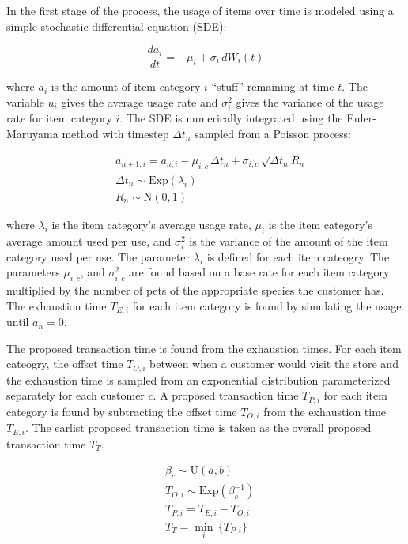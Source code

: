 \documentclass[conference]{IEEEtran}
\begin{document}
In the first stage of the process, the usage of items over time is modeled using a simple stochastic differential equation (SDE):

\begin{equation}
\frac{da_i}{dt} = -\mu_i + \sigma_i\, dW_i(t)
\end{equation}

where $a_i$ is the amount of item category $i$ ``stuff'' remaining at time $t$. The variable $u_i$ gives the average usage rate and $\sigma^2_i$ gives the variance of the usage rate for item category $i$. The SDE is numerically integrated using the Euler-Maruyama method\cite{Klouden13} with timestep $\Delta t_n$ sampled from a Poisson process:

\begin{align}
&a_{n+1, i} = a_{n,i} - \mu_{i, c} \, \Delta t_n + \sigma_{i, c} \, \sqrt{\Delta t_n} R_n \\
&\Delta t_n \sim \text{Exp}(\lambda_i) \nonumber \\
&R_n \sim \text{N}(0, 1) \nonumber
\end{align}

where $\lambda_i$ is the item category's average usage rate, $\mu_i$ is the item category's average amount used per use, and $\sigma^2_i$ is the variance of the amount of the item category used per use. The parameter $\lambda_i$ is defined for each item cateogry.  The parameters $\mu_{i, c}$, and $\sigma^2_{i,c}$ are found based on a base rate for each item category multiplied by the number of pets of the appropriate species the customer has.  The exhaustion time $T_{E,i}$ for each item category is found by simulating the usage until $a_n = 0$.

The proposed transaction time is found from the exhaustion times.  For each item cateogry, the offset time $T_{O, i}$ between when a customer would visit the store and the exhaustion time is sampled from an exponential distribution parameterized separately for each customer $c$. A proposed transaction time $T_{P, i}$ for each item category is found by subtracting the offset time $T_{O, i}$ from the exhaustion time $T_{E, i}$.  The earlist proposed transaction time is taken as the overall proposed transaction time $T_T$.

\begin{align}
&\beta_c \sim \text{U}(a, b) \\
&T_{O, i} \sim \text{Exp}(\beta^{-1}_c) \\
&T_{P, i} = T_{E,i} - T_{O, i} \\
&T_T = \min_i \, \{  T_{P, i}\}
\end{align}
\end{document}
